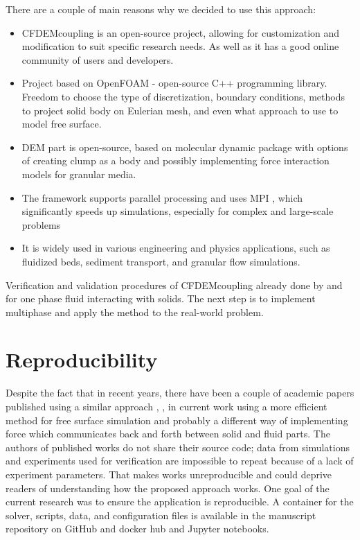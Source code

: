 There are a couple of main reasons why we decided to use this approach:
\begin{itemize}
    \item CFDEMcoupling is an open-source project, allowing for customization and modification to suit specific research needs. As well as it has a good online community of users and developers.
    \item Project based on OpenFOAM - open-source C++ programming library. Freedom to choose the type of discretization, boundary conditions, methods to project solid body on Eulerian mesh, and even what approach to use to model free surface. 
    \item \ac{DEM} part is open-source, based on molecular dynamic package \cite{LAMMPS} with options of creating clump as a body and possibly implementing force interaction models for granular media.
    \item The framework supports parallel processing and uses \ac{MPI} \cite{MPI}, which significantly speeds up simulations, especially for complex and large-scale problems
    \item It is widely used in various engineering and physics applications, such as fluidized beds, sediment transport, and granular flow simulations.
\end{itemize}

Verification and validation procedures of CFDEMcoupling \cite{kloss2011liggghts} already done by \cite{hager2014cfd} and \cite{balachandran2021resolved} for one phase fluid interacting with solids. The next step is to implement multiphase and apply the method to the real-world problem.

\section{Reproducibility}

Despite the fact that in recent years, there have been a couple of academic papers published using a similar approach \cite{nan2023high}, \cite{mao2020resolved}, in current work using a more efficient method for free surface simulation and probably a different way of implementing force which communicates back and forth between solid and fluid parts. The authors of published works do not share their source code; data from simulations and experiments used for verification are impossible to repeat because of a lack of experiment parameters. That makes works unreproducible and could deprive readers of understanding how the proposed approach works. One goal of the current research was to ensure the application is reproducible. A container for the solver, scripts, data, and configuration files is available in the manuscript repository on GitHub \cite{github_solver} and docker hub \cite{docker} and Jupyter notebooks.

